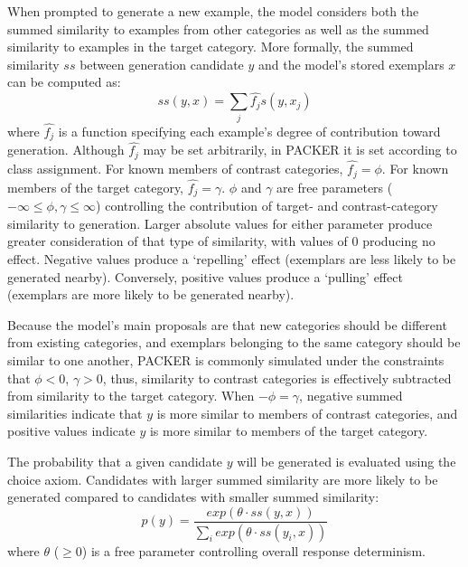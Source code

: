 \documentclass[10pt,letterpaper]{article}
\begin{document}

When prompted to generate a new example, the model considers both the summed similarity to examples from other categories as well as the summed similarity to examples in the target category. More formally, the summed similarity $ss$ between generation candidate $y$ and the model's stored exemplars $x$ can be computed as:
\begin{equation}
  ss(y, x) = \sum_j{\hat{f_j} s(y, x_j)}
\end{equation}
where $\hat{f_j}$ is a function specifying each example's degree of contribution toward generation. Although $\hat{f_j}$ may be set arbitrarily, in PACKER it is set according to class assignment. For known members of contrast categories, $\hat{f_j} = \phi$. For known members of the target category, $\hat{f_j} = \gamma$. $\phi$ and $\gamma$ are free parameters ($-\infty \leq \phi, \gamma \leq \infty$) controlling the contribution of target- and contrast-category similarity to generation. Larger absolute values for either parameter produce greater consideration of that type of similarity, with values of 0 producing no effect. Negative values produce a `repelling' effect (exemplars are less likely to be generated nearby). Conversely, positive values produce a `pulling' effect (exemplars are more likely to be generated nearby). 

Because the model's main proposals are that new categories should be different from existing categories, and exemplars belonging to the same category should be similar to one another, PACKER is commonly simulated under the constraints that $\phi < 0$, $\gamma > 0$, thus, similarity to contrast categories is effectively subtracted from similarity to the target category. When $-\phi = \gamma$, negative summed similarities indicate that $y$ is more similar to members of contrast categories, and positive values indicate $y$ is more similar to members of the target category.

The probability that a given candidate $y$ will be generated is evaluated using the \citet{luce1977choice} choice axiom. Candidates with larger summed similarity are more likely to be generated compared to candidates with smaller summed similarity:
\begin{equation}
p(y) = \dfrac
    { exp( { \theta \cdot ss(y, x) } ) }
    { \sum_i{ exp( { \theta \cdot ss(y_i, x) } ) } }
\end{equation}
where $\theta$ ($\geq 0$) is a free parameter controlling overall response determinism. 
\end{document}
